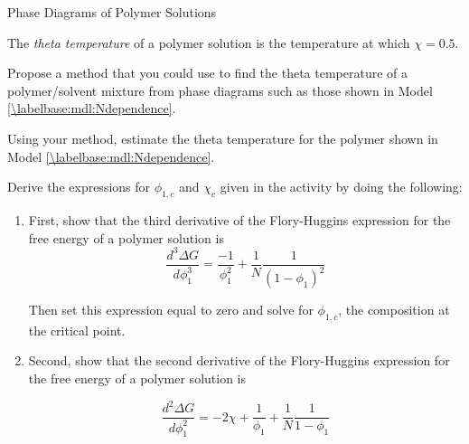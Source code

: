 \begin{activity}{Phase Diagrams of Polymer Solutions}
\begin{ctqs}
\end{ctqs}


\begin{infobox}
	
	The \emph{theta temperature} of a polymer solution is the temperature at which $\chi=0.5$.
	
\end{infobox}


\begin{ctqs}

	\question Propose a method that you could use to find the theta temperature of a polymer/solvent mixture from phase diagrams such as those shown in Model \ref{\labelbase:mdl:Ndependence}.
	
		\begin{solution}[1.5in]
		\end{solution} 

	\question Using your method, estimate the theta temperature for the polymer shown in Model \ref{\labelbase:mdl:Ndependence}.
	
		\begin{solution}[0.5in]
		\end{solution} 

\end{ctqs}



\begin{exercises}

	\exercise Derive the expressions for $\phi_{1,c}$ and $\chi_c$ given in the activity by doing the following:
		\label{\labelbase:exc:critpt}
	
		\begin{enumerate}
	
			\item First, show that the third derivative of the Flory-Huggins expression for the free energy of a polymer solution is
				\begin{equation*}
					\frac{d^3\Delta G}{d\phi_1^3} = \frac{-1}{\phi_1^2} + \frac{1}{N}\frac{1}{(1-\phi_1)^2}
				\end{equation*}
		
				Then set this expression equal to zero and solve for $\phi_{1,c}$, the composition at the critical point.
		
			\item Second, show that the second derivative of the Flory-Huggins expression for the free energy of a polymer solution is
	
				\begin{equation*}
					\frac{d^2\Delta G}{d\phi_1^2} = -2\chi + \frac{1}{\phi_1} + \frac{1}{N}\frac{1}{1-\phi_1}
				\end{equation*}
		

\end{enumerate}
\end{exercises}
\end{activity}
